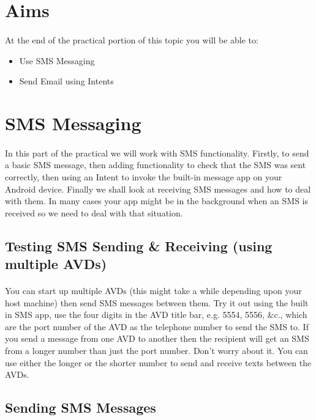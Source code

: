 \section{Aims}
\paragraph{} At the end of the practical portion of this topic you will be able to:

\begin{itemize}
\item Use SMS Messaging
\item Send Email using Intents
\end{itemize}

\section{SMS Messaging}
\paragraph{} In this part of the practical we will work with SMS functionality. Firstly, to send a basic SMS message, then adding functionality to check that the SMS was sent correctly, then using an Intent to invoke the built-in message app on your Android device. Finally we shall look at receiving SMS messages and how to deal with them. In many cases your app might be in the background when an SMS is received so we need to deal with that situation.


\subsection{Testing SMS Sending \& Receiving (using multiple AVDs)}
\paragraph{} You can start up multiple AVDs (this might take a while depending upon your host machine) then send SMS messages between them. Try it out using the built in SMS app, use the four digits in the AVD title bar, e.g. 5554, 5556, \&c., which are the port number of the AVD as the telephone number to send the SMS to. If you send a message from one AVD to another then the recipient will get an SMS from a longer number than just the port number. Don't worry about it. You can use either the longer or the shorter number to send and receive texts between the AVDs.

\subsection{Sending SMS Messages}
